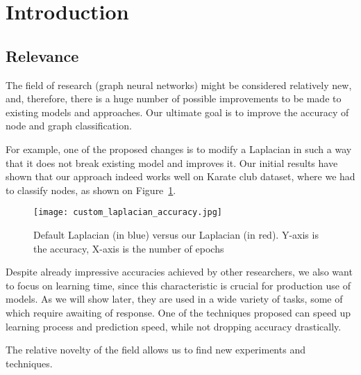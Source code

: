 \section{Introduction}

\subsection{Relevance}
The field of research (graph neural networks) might be considered relatively new, and, therefore, there is a huge number of possible improvements to be made to existing models and approaches.
Our ultimate goal is to improve the accuracy of node and graph classification.

For example, one of the proposed changes is to modify a Laplacian in such a way that it does not break existing model and improves it.
Our initial results have shown that our approach indeed works well on Karate club dataset, where we had to classify nodes, as shown on Figure~\ref{fig:laplacian_graph}.

\begin{figure}[h]
	\centering
	\texttt{[image: custom\_laplacian\_accuracy.jpg]}
	\caption{Default Laplacian (in blue) versus our Laplacian (in red). Y-axis is the accuracy, X-axis is the number of epochs}
	\label{fig:laplacian_graph}
\end{figure}

Despite already impressive accuracies achieved by other researchers, we also want to focus on learning time, since this characteristic is crucial for production use of models.
As we will show later, they are used in a wide variety of tasks, some of which require awaiting of response.
One of the techniques proposed can speed up learning process and prediction speed, while not dropping accuracy drastically.


The relative novelty of the field allows us to find new experiments and techniques.

